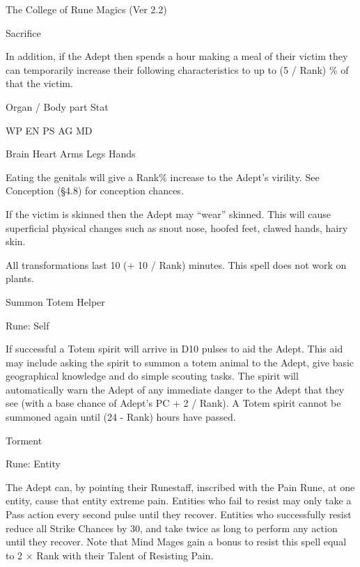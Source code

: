 \begin{Chapter}{The College of Rune Magics (Ver 2.2)}
\begin{spell}[S-12]{Sacrifice }
\begin{effects}
In addition, if the Adept then spends a hour making a meal of their
victim they can temporarily increase their following characteristics
to up to (5 / Rank) \% of that the victim.

Organ / Body part  Stat  

WP  
EN  
PS  
AG  
MD 

Brain 
Heart 
Arms 
Legs 
Hands 

Eating the genitals will give a Rank\% increase to the Adept’s
virility.  See Conception (§4.8) for conception chances.

If the victim is skinned then the Adept may “wear” skinned.  This will
cause superficial physical changes such as snout nose, hoofed feet,
clawed hands, hairy skin.

All transformations last 10 (+ 10 / Rank) minutes.  This spell does
not work on plants.
\end{effects}
\end{spell}

\begin{spell}[S-13]{Summon Totem Helper }

Rune: Self 
\begin{effects}
If successful a Totem spirit will arrive in D10 pulses to aid the
Adept. This aid may include asking the spirit to summon a totem animal
to the Adept, give basic geographical knowledge and do simple scouting
tasks. The spirit will automatically warn the Adept of any immediate
danger to the Adept that they see (with a base chance of Adept’s PC +
2 / Rank).  A Totem spirit cannot be summoned again until (24 -
Rank) hours have passed.
\end{effects}
\end{spell}

\begin{spell}[S-14]{Torment }

Rune: Entity 
\begin{effects}
The Adept can, by pointing their Runestaff, inscribed with the Pain
Rune, at one entity, cause that entity extreme pain. Entities who fail
to resist may only take a Pass action every second pulse until they
recover.  Entities who successfully resist reduce all Strike Chances
by 30, and take twice as long to perform any action until they
recover.  Note that Mind Mages gain a bonus to resist this spell equal
to 2 × Rank with their Talent of Resisting Pain.


\end{effects}
\end{spell}
\end{Chapter}

